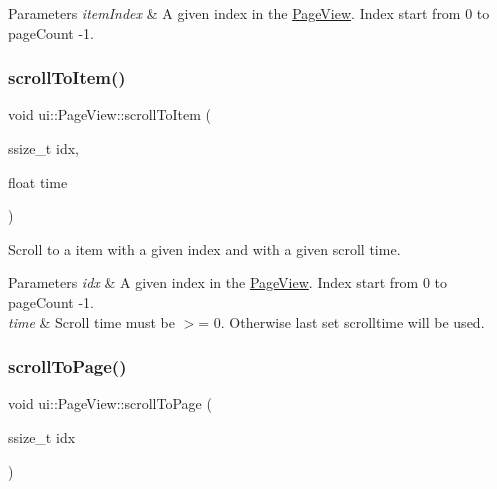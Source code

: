 \begin{DoxyParams}{Parameters}
{\em item\+Index} & A given index in the \hyperlink{classui_1_1PageView}{Page\+View}. Index start from 0 to page\+Count -\/1. \\
\hline
\end{DoxyParams}
\mbox{\label{classui_1_1PageView_a5f686f92ace4bb68004b84124ff7aea2}} 
\subsubsection{\texorpdfstring{scroll\+To\+Item()}{scrollToItem()}\hspace{0.1cm}{\footnotesize\ttfamily [3/3]}}
{\footnotesize\ttfamily void ui\+::\+Page\+View\+::scroll\+To\+Item (\begin{DoxyParamCaption}\item[{ssize\+\_\+t}]{idx,  }\item[{float}]{time }\end{DoxyParamCaption})}

Scroll to a item with a given index and with a given scroll time.


\begin{DoxyParams}{Parameters}
{\em idx} & A given index in the \hyperlink{classui_1_1PageView}{Page\+View}. Index start from 0 to page\+Count -\/1. \\
\hline
{\em time} & Scroll time must be $>$= 0. Otherwise last set scrolltime will be used. \\
\hline
\end{DoxyParams}
\mbox{\label{classui_1_1PageView_a054f9005201643dfb457965f26bf3625}} 
\subsubsection{\texorpdfstring{scroll\+To\+Page()}{scrollToPage()}\hspace{0.1cm}{\footnotesize\ttfamily [1/3]}}
{\footnotesize\ttfamily void ui\+::\+Page\+View\+::scroll\+To\+Page (\begin{DoxyParamCaption}\item[{ssize\+\_\+t}]{idx }\end{DoxyParamCaption})}

